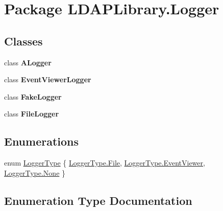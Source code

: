 \hypertarget{namespace_l_d_a_p_library_1_1_logger}{}\section{Package L\+D\+A\+P\+Library.\+Logger}
\label{namespace_l_d_a_p_library_1_1_logger}
\subsection*{Classes}
\begin{DoxyCompactItemize}
\item 
class {\bfseries A\+Logger}
\item 
class {\bfseries Event\+Viewer\+Logger}
\item 
class {\bfseries Fake\+Logger}
\item 
class {\bfseries File\+Logger}
\end{DoxyCompactItemize}
\subsection*{Enumerations}
\begin{DoxyCompactItemize}
\item 
enum \hyperlink{namespace_l_d_a_p_library_1_1_logger_a398123fc2bb2443d0e0821044d077795}{Logger\+Type} \{ \hyperlink{namespace_l_d_a_p_library_1_1_logger_a398123fc2bb2443d0e0821044d077795a0b27918290ff5323bea1e3b78a9cf04e}{Logger\+Type.\+File}, 
\hyperlink{namespace_l_d_a_p_library_1_1_logger_a398123fc2bb2443d0e0821044d077795abf288add49e018ddfdebf1f891ed9770}{Logger\+Type.\+Event\+Viewer}, 
\hyperlink{namespace_l_d_a_p_library_1_1_logger_a398123fc2bb2443d0e0821044d077795a6adf97f83acf6453d4a6a4b1070f3754}{Logger\+Type.\+None}
 \}
\end{DoxyCompactItemize}


\subsection{Enumeration Type Documentation}
\hypertarget{namespace_l_d_a_p_library_1_1_logger_a398123fc2bb2443d0e0821044d077795}{}
